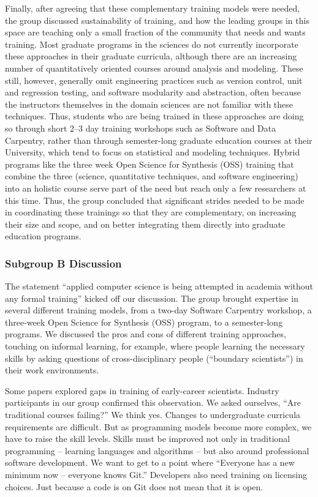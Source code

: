 \documentclass[11pt, oneside]{amsart}
\begin{document}
Finally, after agreeing that these complementary training models were needed, the group discussed sustainability of
training, and how the leading groups in this space are teaching only a small fraction of the community that
needs and wants training.  Most graduate programs in the sciences do not currently incorporate these approaches
in their graduate curricula, although there are an increasing number of quantitatively oriented courses around
analysis and modeling.  These still, however, generally omit engineering practices such as version control, unit
and regression testing, and software modularity and abstraction, often because the instructors themselves in the
domain sciences are not familiar with these techniques.  Thus, students who are being trained in these approaches
are doing so through short 2--3 day training workshops such as Software and Data Carpentry, rather than through
semester-long graduate education courses at their University, which tend to focus on statistical and modeling
techniques.  Hybrid programs like the three week Open Science for Synthesis (OSS) training that combine the three
(science, quantitative techniques, and software engineering) into an holistic course serve part of the need but
reach only a few researchers at this time.  Thus, the group concluded that significant strides needed to be made
in coordinating these trainings so that they are complementary, on increasing their size and scope, and on
better integrating them directly into graduate education programs.


\subsubsection{Subgroup B Discussion}
The statement ``applied computer science is being attempted in academia without
any formal training'' kicked off our discussion. The group brought expertise in
several different training models, from a two-day Software Carpentry workshop,
a three-week Open Science for Synthesis (OSS) program, to a semester-long
programs. We discussed the pros and cons of different training approaches,
touching on informal learning, for example, where people learning the necessary
skills by asking questions of cross-disciplinary people (``boundary scientists'') in
their work environments.

Some papers explored gaps in training of early-career scientists. Industry
participants in our group confirmed this observation. We asked ourselves, ``Are traditional
courses failing?'' We think yes. Changes to undergraduate curricula requirements
are difficult. But as programming models become more complex, we have to raise
the skill levels. Skills must be improved not only in traditional programming --
learning languages and algorithms -- but also around professional software
development. We want to get to a point where ``Everyone has a new minimum now --
everyone knows Git.'' Developers also need training on licensing choices. Just
because a code is on Git does not mean that it is open.
\end{document}
